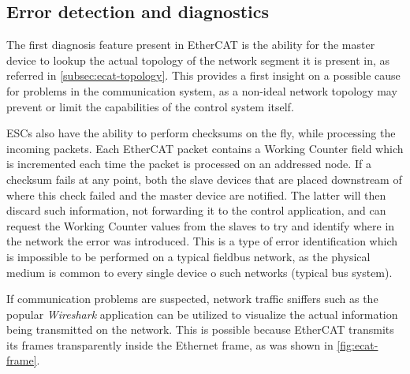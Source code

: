 \subsection{Error detection and diagnostics}

The first diagnosis feature present in EtherCAT is the ability for the master device to lookup the actual topology of the network segment it is present in, as referred in \autoref{subsec:ecat-topology}.
This provides a first insight on a possible cause for problems in the communication system, as a non-ideal network topology may prevent or limit the capabilities of the control system itself.

ESCs also have the ability to perform checksums on the fly, while processing the incoming packets.
Each EtherCAT packet contains a Working Counter field which is incremented each time the packet is processed on an addressed node.
If a checksum fails at any point, both the slave devices that are placed downstream of where this check failed and the master device are notified.
The latter will then discard such information, not forwarding it to the control application, and can request the Working Counter values from the slaves to try and identify where in the network the error was introduced.
This is a type of error identification which is impossible to be performed on a typical fieldbus network, as the physical medium is common to every single device o such networks (typical bus system).

If communication problems are suspected, network traffic sniffers such as the popular \emph{Wireshark} application can be utilized to visualize the actual information being transmitted on the network.
This is possible because EtherCAT transmits its frames transparently inside the Ethernet frame, as was shown in \autoref{fig:ecat-frame}.
